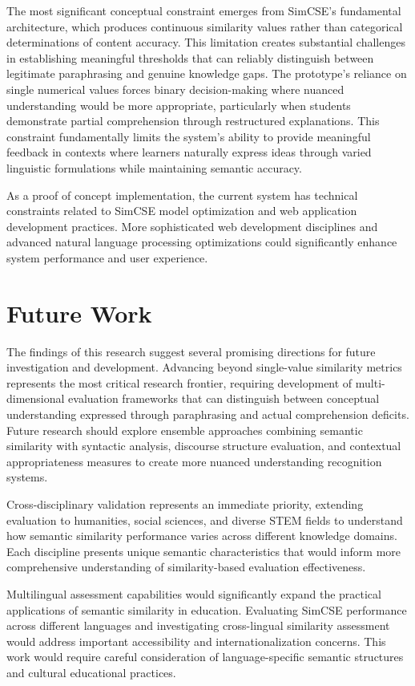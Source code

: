 {The most significant conceptual constraint emerges from SimCSE's fundamental architecture, which produces continuous similarity values rather than categorical determinations of content accuracy. This limitation creates substantial challenges in establishing meaningful thresholds that can reliably distinguish between legitimate paraphrasing and genuine knowledge gaps. The prototype's reliance on single numerical values forces binary decision-making where nuanced understanding would be more appropriate, particularly when students demonstrate partial comprehension through restructured explanations. This constraint fundamentally limits the system's ability to provide meaningful feedback in contexts where learners naturally express ideas through varied linguistic formulations while maintaining semantic accuracy.

As a proof of concept implementation, the current system has technical constraints related to SimCSE model optimization and web application development practices. More sophisticated web development disciplines and advanced natural language processing optimizations could significantly enhance system performance and user experience.

\section{Future Work}

The findings of this research suggest several promising directions for future investigation and development. Advancing beyond single-value similarity metrics represents the most critical research frontier, requiring development of multi-dimensional evaluation frameworks that can distinguish between conceptual understanding expressed through paraphrasing and actual comprehension deficits. Future research should explore ensemble approaches combining semantic similarity with syntactic analysis, discourse structure evaluation, and contextual appropriateness measures to create more nuanced understanding recognition systems.

Cross-disciplinary validation represents an immediate priority, extending evaluation to humanities, social sciences, and diverse STEM fields to understand how semantic similarity performance varies across different knowledge domains. Each discipline presents unique semantic characteristics that would inform more comprehensive understanding of similarity-based evaluation effectiveness.

Multilingual assessment capabilities would significantly expand the practical applications of semantic similarity in education. Evaluating SimCSE performance across different languages and investigating cross-lingual similarity assessment would address important accessibility and internationalization concerns. This work would require careful consideration of language-specific semantic structures and cultural educational practices.

}
